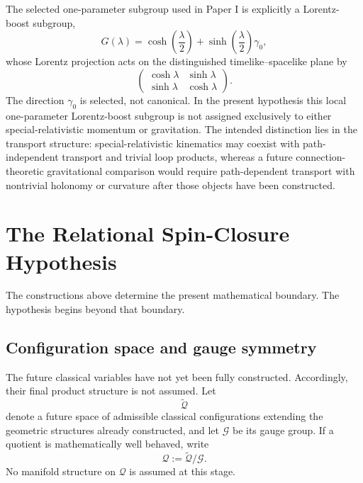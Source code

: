 \documentclass[11pt,a4paper]{article}
\theoremstyle{remark}
\newcommand{\cQ}{\mathcal Q}
\newcommand{\tQ}{\widetilde{\mathcal Q}}
\newcommand{\cG}{\mathcal G}
\begin{document}
The selected one-parameter subgroup used in Paper I is explicitly a Lorentz-boost subgroup,
\[
  G(\lambda)
  =\cosh\!\left(\frac{\lambda}{2}\right)
   +\sinh\!\left(\frac{\lambda}{2}\right)\gamma_0,
\]
whose Lorentz projection acts on the distinguished timelike--spacelike plane by
\[
  \begin{pmatrix}
    \cosh\lambda & \sinh\lambda\\
    \sinh\lambda & \cosh\lambda
  \end{pmatrix}.
\]
The direction \(\gamma_0\) is selected, not canonical.  In the present hypothesis this local one-parameter Lorentz-boost subgroup is not assigned exclusively to either special-relativistic momentum or gravitation.  The intended distinction lies in the transport structure: special-relativistic kinematics may coexist with path-independent transport and trivial loop products, whereas a future connection-theoretic gravitational comparison would require path-dependent transport with nontrivial holonomy or curvature after those objects have been constructed.

\section{The Relational Spin-Closure Hypothesis}

The constructions above determine the present mathematical boundary.  The hypothesis begins beyond that boundary.

\subsection{Configuration space and gauge symmetry}

The future classical variables have not yet been fully constructed.  Accordingly, their final product structure is not assumed.  Let
\begin{equation}
  \tQ
\tag{3.1}
\end{equation}
denote a future space of admissible classical configurations extending the geometric structures already constructed, and let \(\cG\) be its gauge group.  If a quotient is mathematically well behaved, write
\begin{equation}
  \cQ:=\tQ/\cG.
\tag{3.2}
\end{equation}
No manifold structure on \(\cQ\) is assumed at this stage.
\end{document}
